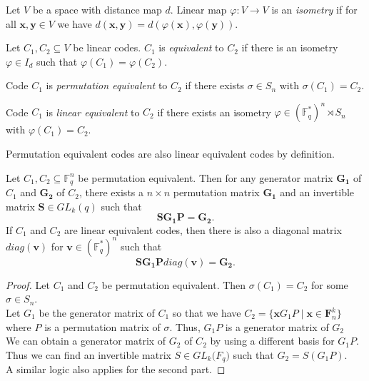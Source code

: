 \begin{definition}[Isometry]
Let $V$ be a space with distance map $d$. Linear map $\varphi: V \xrightarrow{}V$ is an \textit{isometry} if for all $\mathbf{x}, \mathbf{y} \in V$ we have $d(\mathbf{x}, \mathbf{y}) = d(\varphi(\mathbf{x}), \varphi(\mathbf{y}))$.    
\end{definition}

\begin{definition}
Let $C_1, C_2 \subseteq V$ be linear codes. $C_1$ is \textit{equivalent} to $C_2$ if there is an isometry $\varphi \in I_d$ such that $\varphi(C_1) = \varphi(C_2)$.    
\end{definition}

\begin{definition}
Code $C_1$ is \textit{permutation equivalent} to $C_2$ if there exists $\sigma \in S_n$ with $\sigma(C_1) = C_2$.    
\end{definition}

\begin{definition}
Code $C_1$ is \textit{linear equivalent} to $C_2$ if there exists an isometry $\varphi\in (\mathbb{F}_q^*)^n \rtimes S_n$ with $\varphi(C_1) = C_2$.  
\end{definition}

Permutation equivalent codes are also linear equivalent codes by definition.

\begin{proposition}
Let $C_1, C_2 \subseteq \mathbb{F}_q^n$ be permutation equivalent. Then for any generator matrix $\mathbf{G_1}$ of $C_1$ and $\mathbf{G_2}$ of $C_2$, there exists a $n \times n$ permutation matrix $\mathbf{G_1}$ and an invertible matrix $\mathbf{S} \in GL_k(q)$ such that
\[
\mathbf{SG_1P} = \mathbf{G_2}.
\]
If $C_1$ and $C_2$ are linear equivalent codes, then there is also a diagonal matrix $diag(\mathbf{v})$ for $\mathbf{v} \in (\mathbb{F}_q^*)^n$ such that
\[
\mathbf{SG_1P}diag(\mathbf{v}) = \mathbf{G_2}.
\]
\end{proposition}

\begin{proof}
    Let $C_1$ and $C_2$ be permutation equivalent. Then $\sigma(C_1) = C_2$ for some $\sigma\in S_n$.\\Let $G_1$ be the generator matrix of $C_1$ so that we have $C_2 = \{\mathbf{x}G_1P \mid\mathbf{x}\in \mathbf{F}_n^k\}$ where $P$ is a permutation matrix of $\sigma$. Thus, $G_1P$ is a generator matrix of $G_2$\\ We can obtain a generator matrix of $G_2$ of $C_2$ by using a different basis for $G_1P$. Thus we can find an invertible matrix $S \in GL_k{\mathbb({F}_q)}$ such that $G_2 = S(G_1P)$.\\
    A similar logic also applies for the second part.
\end{proof}

